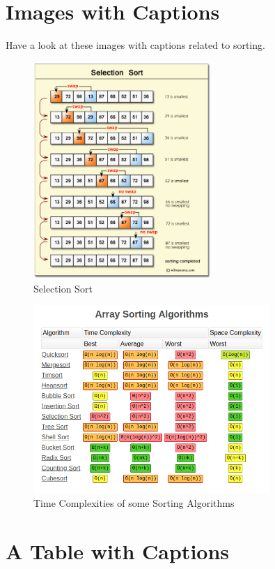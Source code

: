 \documentclass[12pt]{report}
\begin{document}
\chapter{Images with Captions}
Have a look at these images with captions related to sorting.
\begin{figure}[h!]
    \centering
    \includegraphics[width=0.6\textwidth]{images/selection-sort.png}
    \caption{Selection Sort\cite{ssort}}
\end{figure}
\begin{figure}[h!]
    \centering
    \includegraphics[width=0.8\textwidth]{images/complexities.png}
    \caption{Time Complexities of some Sorting Algorithms\cite{complexities}}
\end{figure}

\chapter{A Table with Captions}
\end{document}
